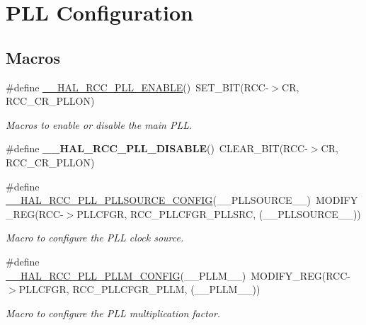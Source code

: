 \hypertarget{group___r_c_c___p_l_l___configuration}{}\section{P\+LL Configuration}
\label{group___r_c_c___p_l_l___configuration}
\subsection*{Macros}
\begin{DoxyCompactItemize}
\item 
\#define \mbox{\hyperlink{group___r_c_c___p_l_l___configuration_gaaf196a2df41b0bcbc32745c2b218e696}{\+\_\+\+\_\+\+H\+A\+L\+\_\+\+R\+C\+C\+\_\+\+P\+L\+L\+\_\+\+E\+N\+A\+B\+LE}}()~S\+E\+T\+\_\+\+B\+IT(R\+CC-\/$>$CR, R\+C\+C\+\_\+\+C\+R\+\_\+\+P\+L\+L\+ON)
\begin{DoxyCompactList}\small\item\em Macros to enable or disable the main P\+LL. \end{DoxyCompactList}\item 
\mbox{\label{group___r_c_c___p_l_l___configuration_ga718a6afcb1492cc2796be78445a7d5ab}} 
\#define {\bfseries \+\_\+\+\_\+\+H\+A\+L\+\_\+\+R\+C\+C\+\_\+\+P\+L\+L\+\_\+\+D\+I\+S\+A\+B\+LE}()~C\+L\+E\+A\+R\+\_\+\+B\+IT(R\+CC-\/$>$CR, R\+C\+C\+\_\+\+C\+R\+\_\+\+P\+L\+L\+ON)
\item 
\#define \mbox{\hyperlink{group___r_c_c___p_l_l___configuration_gaf9a8466f991888332ec978dc92c62d7d}{\+\_\+\+\_\+\+H\+A\+L\+\_\+\+R\+C\+C\+\_\+\+P\+L\+L\+\_\+\+P\+L\+L\+S\+O\+U\+R\+C\+E\+\_\+\+C\+O\+N\+F\+IG}}(\+\_\+\+\_\+\+P\+L\+L\+S\+O\+U\+R\+C\+E\+\_\+\+\_\+)~M\+O\+D\+I\+F\+Y\+\_\+\+R\+EG(R\+CC-\/$>$P\+L\+L\+C\+F\+GR, R\+C\+C\+\_\+\+P\+L\+L\+C\+F\+G\+R\+\_\+\+P\+L\+L\+S\+RC, (\+\_\+\+\_\+\+P\+L\+L\+S\+O\+U\+R\+C\+E\+\_\+\+\_\+))
\begin{DoxyCompactList}\small\item\em Macro to configure the P\+LL clock source. \end{DoxyCompactList}\item 
\#define \mbox{\hyperlink{group___r_c_c___p_l_l___configuration_gabca62f581e6c2553cca7ef0d7a2a4b7f}{\+\_\+\+\_\+\+H\+A\+L\+\_\+\+R\+C\+C\+\_\+\+P\+L\+L\+\_\+\+P\+L\+L\+M\+\_\+\+C\+O\+N\+F\+IG}}(\+\_\+\+\_\+\+P\+L\+L\+M\+\_\+\+\_\+)~M\+O\+D\+I\+F\+Y\+\_\+\+R\+EG(R\+CC-\/$>$P\+L\+L\+C\+F\+GR, R\+C\+C\+\_\+\+P\+L\+L\+C\+F\+G\+R\+\_\+\+P\+L\+LM, (\+\_\+\+\_\+\+P\+L\+L\+M\+\_\+\+\_\+))
\begin{DoxyCompactList}\small\item\em Macro to configure the P\+LL multiplication factor. \end{DoxyCompactList}\end{DoxyCompactItemize}


